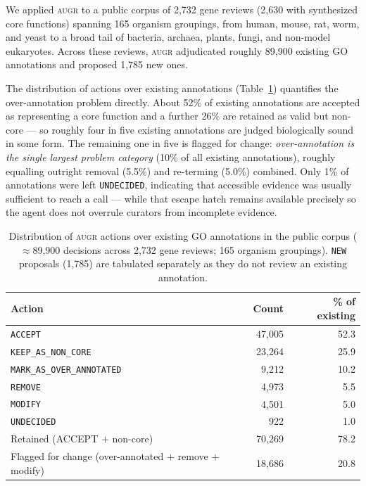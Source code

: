 \documentclass[11pt]{article}
\newcommand{\augr}{\textsc{augr}}
\newcommand{\code}[1]{\texttt{#1}}
\begin{document}
We applied \augr{} to a public corpus of 2{,}732 gene reviews (2{,}630 with
synthesized core functions) spanning 165 organism groupings, from human, mouse,
rat, worm, and yeast to a broad tail of bacteria, archaea, plants, fungi, and
non-model eukaryotes. Across these reviews, \augr{} adjudicated roughly 89{,}900
existing GO annotations and proposed 1{,}785 new ones.

The distribution of actions over existing annotations (Table~\ref{tab:corpus})
quantifies the over-annotation problem directly. About 52\% of existing
annotations are accepted as representing a core function and a further 26\% are
retained as valid but non-core --- so roughly four in five existing annotations are
judged biologically sound in some form. The remaining one in five is flagged for
change: \emph{over-annotation is the single largest problem category} (10\% of all
existing annotations), roughly equalling outright removal (5.5\%) and re-terming
(5.0\%) combined. Only 1\% of annotations were left \code{UNDECIDED}, indicating
that accessible evidence was usually sufficient to reach a call --- while that
escape hatch remains available precisely so the agent does not overrule curators
from incomplete evidence.

\begin{table}[htbp]
\centering
\caption{Distribution of \augr{} actions over existing GO annotations in the
public corpus ($\approx$89{,}900 decisions across 2{,}732 gene reviews; 165
organism groupings). \code{NEW} proposals (1{,}785) are tabulated separately as
they do not review an existing annotation.}
\label{tab:corpus}
\small
\begin{tabular}{@{}lrr@{}}
\toprule
\textbf{Action} & \textbf{Count} & \textbf{\% of existing} \\
\midrule
\code{ACCEPT} & 47{,}005 & 52.3 \\
\code{KEEP\_AS\_NON\_CORE} & 23{,}264 & 25.9 \\
\code{MARK\_AS\_OVER\_ANNOTATED} & 9{,}212 & 10.2 \\
\code{REMOVE} & 4{,}973 & 5.5 \\
\code{MODIFY} & 4{,}501 & 5.0 \\
\code{UNDECIDED} & 922 & 1.0 \\
\midrule
Retained (ACCEPT $+$ non-core) & 70{,}269 & 78.2 \\
Flagged for change (over-annotated $+$ remove $+$ modify) & 18{,}686 & 20.8 \\
\bottomrule
\end{tabular}
\end{table}
\end{document}
